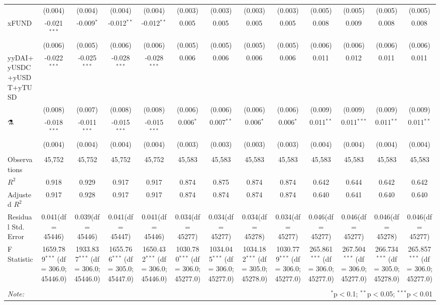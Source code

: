 \begin{table}[!htbp]
\begin{tabular}{@{\extracolsep{5pt}}lcccccccccccc}
  & (0.004) & (0.004) & (0.004) & (0.004) & (0.003) & (0.003) & (0.003) & (0.003) & (0.005) & (0.005) & (0.005) & (0.005) \\
 xFUND & -0.021$^{***}$ & -0.009$^{*}$ & -0.012$^{**}$ & -0.012$^{**}$ & 0.005$^{}$ & 0.005$^{}$ & 0.005$^{}$ & 0.005$^{}$ & 0.008$^{}$ & 0.009$^{}$ & 0.008$^{}$ & 0.008$^{}$ \\
  & (0.006) & (0.005) & (0.006) & (0.006) & (0.005) & (0.005) & (0.005) & (0.005) & (0.006) & (0.006) & (0.006) & (0.006) \\
 yyDAI+yUSDC+yUSDT+yTUSD & -0.022$^{***}$ & -0.025$^{***}$ & -0.028$^{***}$ & -0.028$^{***}$ & 0.006$^{}$ & 0.006$^{}$ & 0.006$^{}$ & 0.006$^{}$ & 0.011$^{}$ & 0.012$^{}$ & 0.011$^{}$ & 0.011$^{}$ \\
  & (0.008) & (0.007) & (0.008) & (0.008) & (0.006) & (0.006) & (0.006) & (0.006) & (0.009) & (0.009) & (0.009) & (0.009) \\
 ⚗️ & -0.018$^{***}$ & -0.011$^{***}$ & -0.015$^{***}$ & -0.015$^{***}$ & 0.006$^{*}$ & 0.007$^{**}$ & 0.006$^{*}$ & 0.006$^{*}$ & 0.011$^{**}$ & 0.011$^{***}$ & 0.011$^{**}$ & 0.011$^{**}$ \\
  & (0.004) & (0.004) & (0.004) & (0.004) & (0.003) & (0.003) & (0.003) & (0.003) & (0.004) & (0.004) & (0.004) & (0.004) \\
\hline \\[-1.8ex]
 Observations & 45,752 & 45,752 & 45,752 & 45,752 & 45,583 & 45,583 & 45,583 & 45,583 & 45,583 & 45,583 & 45,583 & 45,583 \\
 $R^2$ & 0.918 & 0.929 & 0.917 & 0.917 & 0.874 & 0.875 & 0.874 & 0.874 & 0.642 & 0.644 & 0.642 & 0.642 \\
 Adjusted $R^2$ & 0.917 & 0.928 & 0.917 & 0.917 & 0.874 & 0.874 & 0.874 & 0.874 & 0.640 & 0.641 & 0.640 & 0.640 \\
 Residual Std. Error & 0.041(df = 45446) & 0.039(df = 45446) & 0.041(df = 45447) & 0.041(df = 45446) & 0.034(df = 45277) & 0.034(df = 45277) & 0.034(df = 45278) & 0.034(df = 45277) & 0.046(df = 45277) & 0.046(df = 45277) & 0.046(df = 45278) & 0.046(df = 45277)  \\
 F Statistic & 1659.789$^{***}$ (df = 306.0; 45446.0) & 1933.837$^{***}$ (df = 306.0; 45446.0) & 1655.766$^{***}$ (df = 305.0; 45447.0) & 1650.432$^{***}$ (df = 306.0; 45446.0) & 1030.780$^{***}$ (df = 306.0; 45277.0) & 1034.045$^{***}$ (df = 306.0; 45277.0) & 1034.182$^{***}$ (df = 305.0; 45278.0) & 1030.779$^{***}$ (df = 306.0; 45277.0) & 265.861$^{***}$ (df = 306.0; 45277.0) & 267.504$^{***}$ (df = 306.0; 45277.0) & 266.734$^{***}$ (df = 305.0; 45278.0) & 265.857$^{***}$ (df = 306.0; 45277.0) \\
\hline
\hline \\[-1.8ex]
\textit{Note:} & \multicolumn{12}{r}{$^{*}$p$<$0.1; $^{**}$p$<$0.05; $^{***}$p$<$0.01} \\
\end{tabular}
\end{table}